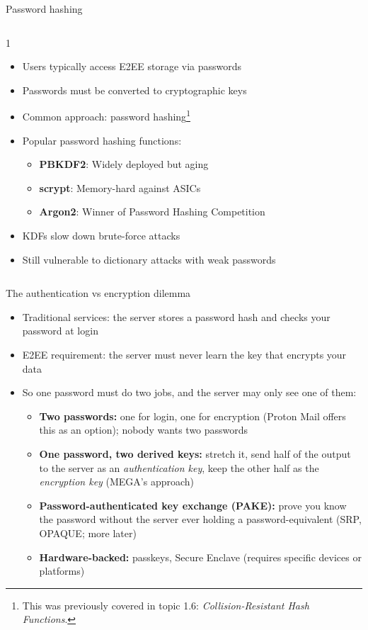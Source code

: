\ifdefined\PRESENTATION\else\PassOptionsToClass{handout}{beamer}\fi\documentclass[aspectratio=169, lualatex]{beamer}
\begin{document}
\begin{frame}{Password hashing}
	\begin{columns}[c]
		\begin{column}{1\textwidth}
			\begin{itemize}
				\item Users typically access E2EE storage via passwords
				\item Passwords must be converted to cryptographic keys
				\item Common approach: password hashing\footnote{This was previously covered in topic 1.6: \textit{Collision-Resistant Hash Functions}.}
				\item Popular password hashing functions:
				      \begin{itemize}
					      \item \textbf{PBKDF2}: Widely deployed but aging
					      \item \textbf{scrypt}: Memory-hard against ASICs
					      \item \textbf{Argon2}: Winner of Password Hashing Competition
				      \end{itemize}
				\item KDFs slow down brute-force attacks
				\item Still vulnerable to dictionary attacks with weak passwords
			\end{itemize}
		\end{column}
	\end{columns}
\end{frame}

\begin{frame}{The authentication vs encryption dilemma}
	\begin{itemize}
		\item Traditional services: the server stores a password hash and checks your password at login
		\item E2EE requirement: the server must never learn the key that encrypts your data
		\item So one password must do two jobs, and the server may only see one of them:
		      \begin{itemize}
			      \item \textbf{Two passwords:} one for login, one for encryption (Proton Mail offers this as an option); nobody wants two passwords
			      \item \textbf{One password, two derived keys:} stretch it, send half of the output to the server as an \textit{authentication key}, keep the other half as the \textit{encryption key} (MEGA's approach)
			      \item \textbf{Password-authenticated key exchange (PAKE):} prove you know the password without the server ever holding a password-equivalent (SRP, OPAQUE; more later)
			      \item \textbf{Hardware-backed:} passkeys, Secure Enclave (requires specific devices or platforms)
		      \end{itemize}
	\end{itemize}
\end{frame}
\end{document}
